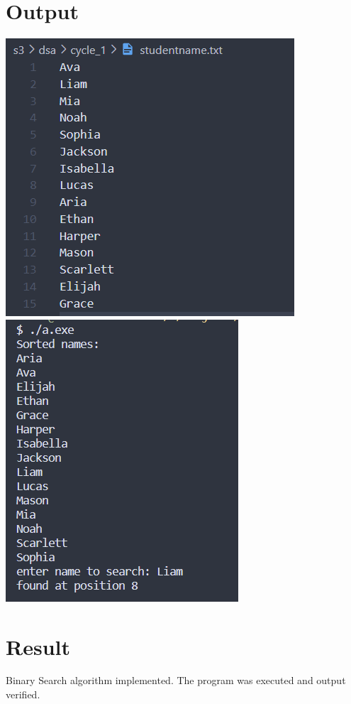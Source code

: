 \section{Output}
\includegraphics[]{Cycle_1/Outputs/BinarySearch2.png}
\includegraphics[]{Cycle_1/Outputs/BinarySearch1.png}

\section{Result}
Binary Search algorithm implemented. The program was executed and output verified.